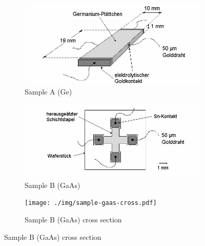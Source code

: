 \begin{figure}
	\centering
	\begin{subfigure}{0.45\textwidth}
		\centering
		\includegraphics[width=\textwidth]{./img/sample-ge.png}
		\caption{Sample A (Ge)}
		\label{fig:samples:ge}
	\end{subfigure}
	\begin{subfigure}{0.45\textwidth}
		\centering
		\includegraphics[width=\textwidth]{./img/sample-gaas-clover.png}
		\caption{Sample B (GaAs)}
		\label{fig:samples:gaas-clover}
	\end{subfigure}
	\begin{subfigure}{0.7\textwidth}
		\centering
		\texttt{[image: ./img/sample-gaas-cross.pdf]}
		\caption{Sample B (GaAs) cross section}
		\label{fig:samples:gaas-cross}
	\end{subfigure}
\end{figure}
